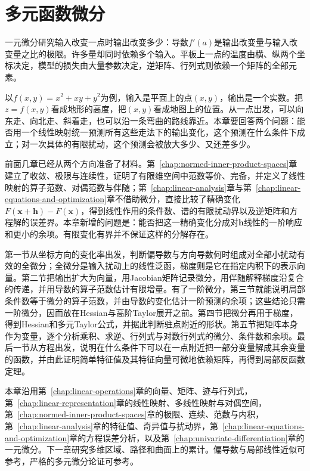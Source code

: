 \chapter{多元函数微分}
\label{chap:multivariate-calculus}
\label{chap:multivariable-functions}

一元微分研究输入改变一点时输出改变多少：导数$f'(a)$是输出改变量与输入改变量之比的极限。许多量却同时依赖多个输入。平板上一点的温度由横、纵两个坐标决定，模型的损失由大量参数决定，逆矩阵、行列式则依赖一个矩阵的全部元素。

以$f(x,y)=x^2+xy+y^2$为例，输入是平面上的点$(x,y)$，输出是一个实数。把$z=f(x,y)$看成地形的高度，把$(x,y)$看成地图上的位置。从一点出发，可以向东走、向北走、斜着走，也可以沿一条弯曲的路线靠近。本章要回答两个问题：能否用一个线性映射统一预测所有这些走法下的输出变化，这个预测在什么条件下成立；对一次具体的有限扰动，这个预测会被放大多少、又还差多少。

前面几章已经从两个方向准备了材料。第~\ref{chap:normed-inner-product-spaces}章建立了收敛、极限与连续性，证明了有限维空间中范数等价、完备，并定义了线性映射的算子范数、对偶范数与伴随；第~\ref{chap:linear-analysis}章与第~\ref{chap:linear-equations-and-optimization}章不借助微分，直接比较了精确变化$F(\bm x+\bm h)-F(\bm x)$，得到线性作用的条件数、谱的有限扰动界以及逆矩阵和方程解的误差界。本章新增的问题是：能否把这一精确变化分成对$\bm h$线性的一阶响应和更小的余项。有限变化有界并不保证这样的分解存在。

第一节从坐标方向的变化率出发，判断偏导数与方向导数何时组成对全部小扰动有效的全微分；全微分是输入扰动上的线性泛函，梯度则是它在指定内积下的表示向量。第二节把输出扩大为向量，用Jacobian矩阵记录微分，用伴随解释梯度沿复合的传递，并用导数的算子范数估计有限增量。有了一阶微分，第三节就能说明局部条件数等于微分的算子范数，并由导数的变化估计一阶预测的余项；这些结论只需一阶微分，因而放在Hessian与高阶Taylor展开之前。第四节把微分再用于梯度，得到Hessian和多元Taylor公式，并据此判断驻点附近的形状。第五节把矩阵本身作为变量，逐个分析乘积、求逆、行列式与对数行列式的微分、条件数和余项。最后一节从方程出发，说明在什么条件下可以在一点附近把一部分变量解成其余变量的函数，并由此证明简单特征值及其特征向量可微地依赖矩阵，再得到局部反函数定理。

本章沿用第~\ref{chap:linear-operations}章的向量、矩阵、迹与行列式，第~\ref{chap:linear-representation}章的线性映射、多线性映射与对偶空间，第~\ref{chap:normed-inner-product-spaces}章的极限、连续、范数与内积，第~\ref{chap:linear-analysis}章的特征值、奇异值与扰动界，第~\ref{chap:linear-equations-and-optimization}章的方程误差分析，以及第~\ref{chap:univariate-differentiation}章的一元微分。下一章研究多维区域、路径和曲面上的累计。偏导数与局部线性近似可参考，严格的多元微分论证可参考。

